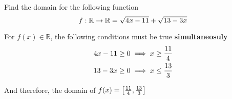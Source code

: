 

\question[2] Find the domain for the following function 
\[
  f:\mathbb{R}\rightarrow\mathbb{R} = \sqrt{4 x - 11} + \sqrt{13 - 3 x}
\]

\watchout

\begin{solution}[\mcq]
  For $f(x)\in\mathbb{R}$, the following conditions must be true \textbf{simultaneosuly}
  \begin{align}
    4 x - 11 \geq 0 &\implies x\geq\frac{11}{4} \\
    13 - 3 x \geq 0 &\implies x\leq\frac{13}{3}
  \end{align}

  And therefore, the domain of $f(x)=\left[ \frac{11}{4}, \frac{13}{3} \right]$
\end{solution}

